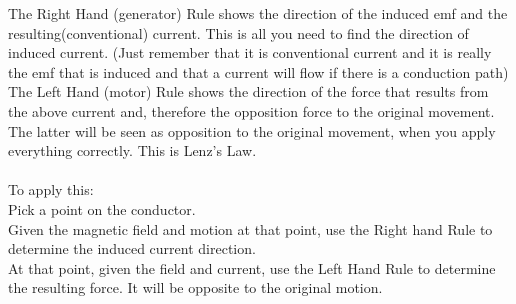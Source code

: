 \begin{note}
The Right Hand (generator) Rule shows the direction of the induced emf and the resulting(conventional) current. This is all you need to find the direction of induced current. (Just remember that it is conventional current and it is really the emf that is induced and that a current will flow if there is a conduction path)\\
The Left Hand (motor) Rule shows the direction of the force that results from the above current and, therefore the opposition force to the original movement.\\
The latter will be seen as opposition to the original
	movement, when you apply everything correctly. This is Lenz's Law.\\\\
	To apply this:
\\	Pick a point on the conductor.\\
Given the magnetic field and motion at that point, use the Right hand Rule to determine the induced current direction.\\
At that point, given the field and current, use the Left Hand Rule to determine the resulting force. It will be opposite to the original motion.
\end{note}
